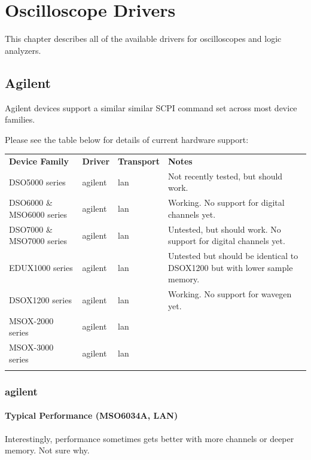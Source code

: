 \chapter{Oscilloscope Drivers}
\label{sec:scope-drivers}

This chapter describes all of the available drivers for oscilloscopes and logic analyzers.

\section{Agilent}

Agilent devices support a similar similar SCPI command set across most device families.

Please see the table below for details of current hardware support:

\begin{tabularx}{16cm}{lllX}
\thickhline
\textbf{Device Family} & \textbf{Driver} & \textbf{Transport} & \textbf{Notes} \\
\thickhline
DSO5000 series & agilent & lan & Not recently tested, but should work.\\
\thinhline
DSO6000 \& MSO6000 series & agilent & lan &  Working. No support for digital channels yet.\\
\thinhline
DSO7000 \& MSO7000 series & agilent & lan & Untested, but should work. No support for digital channels yet.\\
\thinhline
EDUX1000 series & agilent & lan & Untested but should be identical to DSOX1200 but with lower sample memory. \\
\thinhline
DSOX1200 series & agilent & lan & Working. No support for wavegen yet. \\
\thinhline
MSOX-2000 series & agilent & lan \\
\thinhline
MSOX-3000 series & agilent & lan \\
\thickhline
\end{tabularx}

\subsection{agilent}

\subsubsection{Typical Performance (MSO6034A, LAN)}

Interestingly, performance sometimes gets better with more channels or deeper memory. Not sure why.

